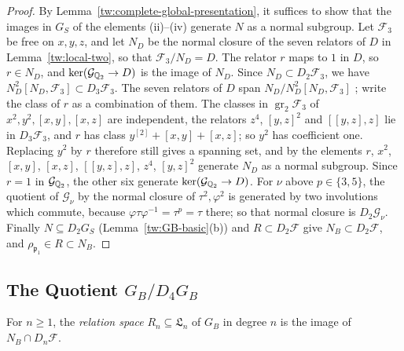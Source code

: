 \begin{proof}
By Lemma~\ref{tw:complete-global-presentation}, it suffices to show that the
images in $G_S$ of the elements (ii)--(iv) generate $N$ as a normal
subgroup. Let $\mathcal F_3$ be free on $x,y,z$, and let $N_D$ be the normal
closure of the seven relators of $D$ in Lemma~\ref{tw:local-two}, so that
$\mathcal F_3/N_D=D$. The relator $r$ maps to $1$ in $D$, so $r\in N_D$, and
$\ker(\mathcal G_{\mathbb Q_2}\to D)$ is the image of $N_D$. Since
$N_D\subset D_2\mathcal F_3$, we have
$N_D^2[N_D,\mathcal F_3]\subset D_3\mathcal F_3$. The seven relators of $D$
span $N_D/N_D^2[N_D,\mathcal F_3]$
\cite[Corollary~3.9.3]{NeukirchSchmidtWingberg2008}; write the class of $r$ as
a combination of them. The classes in $\operatorname{gr}_2\mathcal F_3$ of
$x^2,y^2,[x,y],[x,z]$ are independent, the relators $z^4$, $[y,z]^2$ and
$[[y,z],z]$ lie in $D_3\mathcal F_3$, and $r$ has class
$y^{[2]}+[x,y]+[x,z]$; so $y^2$ has coefficient one. Replacing $y^2$ by $r$
therefore still gives a spanning set, and by
\cite[Corollary~3.9.3]{NeukirchSchmidtWingberg2008} the elements $r$, $x^2$,
$[x,y]$, $[x,z]$, $[[y,z],z]$, $z^4$, $[y,z]^2$ generate $N_D$ as a normal
subgroup. Since $r=1$ in $\mathcal G_{\mathbb Q_2}$, the other six generate
$\ker(\mathcal G_{\mathbb Q_2}\to D)$. For $\nu$ above $p\in\{3,5\}$, the quotient
of $\mathcal G_\nu$ by the normal closure of $\tau^2,\varphi^2$ is generated
by two involutions which commute, because
$\varphi\tau\varphi^{-1}=\tau^p=\tau$ there; so that normal closure is
$D_2\mathcal G_\nu$. Finally $N\subseteq D_2G_S$
(Lemma~\ref{tw:GB-basic}(b)) and
$R\subset D_2\mathcal F$ give $N_B\subset D_2\mathcal F$, and
$\rho_{\mathfrak p_1}\in R\subset N_B$.
\end{proof}

\subsection{\texorpdfstring{The Quotient $G_B/D_4G_B$}{The Quotient G\_B/D\_4G\_B}}\label{tw:retained-section}

\begin{definition}\label{tw:relation-space}
For $n\ge1$, the \emph{relation space} $R_n\subseteq\mathfrak L_n$ of $G_B$
in degree $n$ is the image of $N_B\cap D_n\mathcal F$.
\end{definition}

